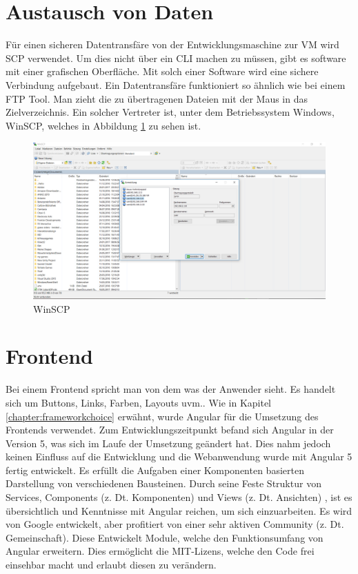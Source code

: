 \newpage
\section{Austausch von Daten}
Für einen sicheren Datentransfäre von der Entwicklungsmaschine zur \acl{VM} wird \ac{SCP} verwendet. Um dies nicht über ein \ac{CLI} machen zu müssen, gibt es software mit einer grafischen Oberfläche. Mit solch einer Software wird eine sichere Verbindung aufgebaut. Ein Datentransfäre funktioniert so ähnlich wie bei einem \ac{FTP} Tool. Man zieht die zu übertragenen Dateien mit der Maus in das Zielverzeichnis. Ein solcher Vertreter ist, unter dem Betriebssystem Windows, WinSCP, welches in Abbildung \ref{fig:winscp} zu sehen ist.

\begin{figure}[bh]
	\centering
	\includegraphics[scale=0.3]{content/pictures/winscp.png}
	\caption{ WinSCP}
	\label{fig:winscp}
\end{figure}



\section{Frontend}
\label{chapter:frontend}
Bei einem Frontend spricht man von dem was der Anwender sieht. Es handelt sich um Buttons, Links, Farben, Layouts \ac{uvm.}. Wie in Kapitel \ref{chapter:frameworkchoice} erwähnt, wurde Angular für die Umsetzung des Frontends verwendet. Zum Entwicklungszeitpunkt befand sich Angular in der Version 5, was sich im Laufe der Umsetzung geändert hat. Dies nahm jedoch keinen Einfluss auf die Entwicklung und die Webanwendung wurde mit Angular 5 fertig entwickelt. Es erfüllt die Aufgaben einer Komponenten basierten Darstellung von verschiedenen Bausteinen.  Durch seine Feste Struktur von Services, Components (\ac{z. Dt.} Komponenten) und Views (\ac{z. Dt.} Ansichten) \autocite{Clow.2018}, ist es übersichtlich und Kenntnisse mit Angular reichen, um sich einzuarbeiten. Es wird von Google entwickelt, aber profitiert von einer sehr aktiven Community (\ac{z. Dt.} Gemeinschaft). Diese Entwickelt Module, welche den Funktionsumfang von Angular erweitern. Dies ermöglicht die \ac{MIT}-Lizens, welche den Code frei einsehbar macht und erlaubt diesen zu verändern.\autocite{BonnyKern.2017}

